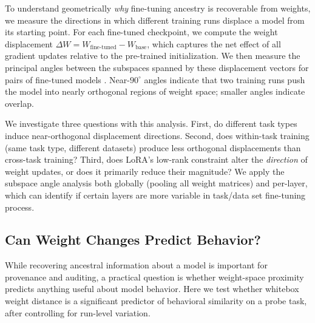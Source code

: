\documentclass{article}
\begin{document}

To understand geometrically \textit{why} fine-tuning ancestry is recoverable from
weights, we measure the directions in which different training runs displace a model
from its starting point. For each fine-tuned checkpoint, we compute the weight
displacement $\Delta W = W_{\text{fine-tuned}} - W_{\text{base}}$, which captures
the net effect of all gradient updates relative to the pre-trained initialization.
We then measure the principal angles between the subspaces spanned by these
displacement vectors for pairs of fine-tuned models \citep{ilharco2023editing}.
Near-$90^\circ$ angles indicate that two training runs push the model into nearly
orthogonal regions of weight space; smaller angles indicate overlap.

We investigate three questions with this analysis. First, do different task types
induce near-orthogonal displacement directions. Second, does within-task training (same task type, different datasets) produce less orthogonal displacements than cross-task training? Third, does
LoRA's low-rank constraint alter the \textit{direction} of weight updates, or
does it primarily reduce their magnitude? We apply the subspace angle analysis
both globally (pooling all weight matrices) and per-layer, which can identify if certain layers are more variable in task/data set fine-tuning process.


\subsection{Can Weight Changes Predict Behavior?}
\label{sec:exp:behavioral}

While recovering ancestral information about a model is important for
provenance and auditing, a practical question is whether weight-space
proximity predicts anything useful about model behavior. Here we test
whether whitebox weight distance is a significant predictor of behavioral
similarity on a probe task, after controlling for run-level variation.
\end{document}
